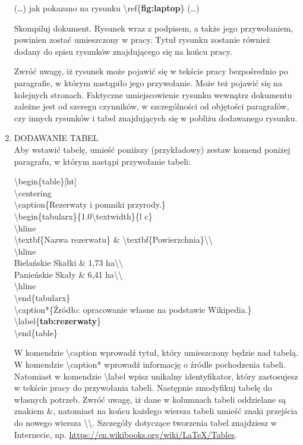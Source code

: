 \begin{enumerate}
	(\ldots) jak pokazano na rysunku \textbackslash ref\{\textbf{fig:laptop}\} (\ldots) 
	
	Skompiluj dokument. Rysunek wraz z podpisem, a także jego przywołaniem, powinien zostać umieszczony w pracy. Tytuł rysunku zostanie również dodany do spisu rysunków znajdującego się na końcu pracy.
	
	Zwróć uwagę, iż rysunek może pojawić się w tekście pracy bezpośrednio po paragrafie, w którym nastąpiło jego przywołanie. Może też pojawić się na kolejnych stronach. Faktyczne umiejscowienie rysunku wewnątrz dokumentu zależne jest od szeregu czynników, w szczególności od objętości paragrafów, czy innych rysunków i tabel znajdujących się w pobliżu dodawanego rysunku.
	
	\item DODAWANIE TABEL\\
	Aby wstawić tabelę, umieść poniższy (przykładowy) zestaw komend poniżej paragrafu, w którym nastąpi przywołanie tabeli:
	
	\textbackslash begin\{table\}[ht]\\
		\textbackslash centering\\
		\textbackslash caption\{Rezerwaty i pomniki przyrody.\}\\
		\textbackslash begin\{tabularx\}\{1.0\textbackslash textwidth\}\{l c\}\\
			\textbackslash hline\\
			\textbackslash textbf\{Nazwa rezerwatu\} \& \textbackslash textbf\{Powierzchnia\}\textbackslash\textbackslash\\
			\textbackslash hline\\
			Bielańskie Skałki	 	 \& 1,73 ha\textbackslash\textbackslash\\
			Panieńskie Skały		 \& 6,41 ha\textbackslash\textbackslash\\
			\textbackslash hline\\		
		\textbackslash end\{tabularx\}\\
		\textbackslash caption*\{Źródło: opracowanie własne na podstawie Wikipedia.\}\\
		\textbackslash label\{\textbf{tab:rezerwaty}\}\\
	\textbackslash end\{table\}
	
	W komendzie \textbackslash caption wprowadź tytuł, który umieszczony będzie nad tabelą. W komendzie \textbackslash caption* wprowadź informację o źródle pochodzenia tabeli. Natomiast w komendzie \textbackslash label wpisz unikalny identyfikator, który zastosujesz w tekście pracy do przywołania tabeli. Następnie zmodyfikuj tabelę do własnych potrzeb. Zwróć uwagę, iż dane w kolumnach tabeli oddzielane są znakiem \&, natomiast na końcu każdego wiersza tabeli umieść znaki przejścia do nowego wiersza \textbackslash\textbackslash. Szczegóły dotyczące tworzenia tabel znajdziesz w Internecie, np. \url{https://en.wikibooks.org/wiki/LaTeX/Tables}.
	

\end{enumerate}
